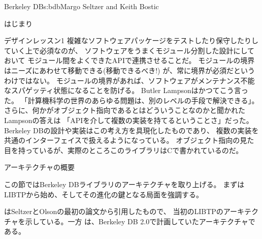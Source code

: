 \begin{aosachapter}{Berkeley DB}{s:bdb}{Margo Seltzer and Keith Bostic}
\begin{aosasect1}{はじまり}
\begin{aosabox}{デザインレッスン1}
複雑なソフトウェアパッケージをテストしたり保守したりしていく上で必須なのが、
ソフトウェアをうまくモジュール分割した設計にしておいて
モジュール間をよくできたAPIで連携させることだ。
モジュールの境界はニーズにあわせて移動できる(移動できるべき!)
が、常に境界が必須だというわけではない。
モジュールの境界があれば、ソフトウェアがメンテナンス不能なスパゲッティ状態になることを防げる。
Butler Lampsonはかつてこう言った。
「計算機科学の世界のあらゆる問題は、別のレベルの手段で解決できる」。
さらに、何かがオブジェクト指向であるとはどういうことなのかと聞かれたLampsonの答えは
「APIを介して複数の実装を持てるということさ」だった。
Berkeley DBの設計や実装はこの考え方を具現化したものであり、
複数の実装を共通のインターフェイスで扱えるようになっている。
オブジェクト指向の見た目を持っているが、実際のところこのライブラリはCで書かれているのだ。

\end{aosabox}

\end{aosasect1}

\begin{aosasect1}{アーキテクチャの概要}

この節ではBerkeley DBライブラリのアーキテクチャを取り上げる。
まずはLIBTPから始め、そしてその進化の鍵となる局面を強調する。

はSeltzerとOlsonの最初の論文から引用したもので、
当初のLIBTPのアーキテクチャを示している。一方
は、Berkeley DB 2.0で計画していたアーキテクチャである。


\end{aosasect1}
\end{aosachapter}
